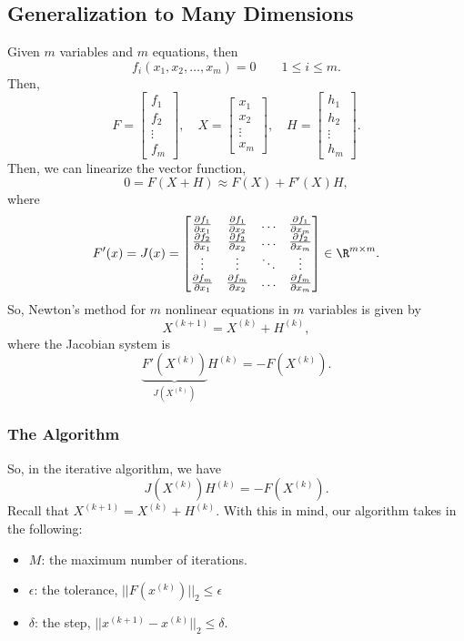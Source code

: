 \documentclass[letterpaper]{article}
\begin{document}
\subsection{Generalization to Many Dimensions}
Given $m$ variables and $m$ equations, then 
\[f_{i}(x_1, x_2, \hdots, x_m) = 0 \qquad 1 \leq i \leq m.\]
Then, 
\[F = \begin{bmatrix}
    f_1 \\ f_2 \\ \vdots \\ f_m
\end{bmatrix}, \quad X = \begin{bmatrix}
    x_1 \\ x_2 \\ \vdots \\ x_m 
\end{bmatrix}, \quad H = \begin{bmatrix}
    h_1 \\ h_2 \\ \vdots \\ h_m
\end{bmatrix}.\]
Then, we can linearize the vector function, 
\[0 = F(X + H) \approx F(X) + F'(X)H,\]
where 
\[F'(x) = J(x) = \begin{bmatrix}
    \frac{\partial f_1}{\partial x_1} & \frac{\partial f_1}{\partial x_2} & \hdots & \frac{\partial f_1}{\partial x_m} \\ 
    \frac{\partial f_2}{\partial x_1} & \frac{\partial f_2}{\partial x_2} & \hdots & \frac{\partial f_2}{\partial x_m} \\ 
    \vdots & \vdots & \ddots & \vdots \\ 
    \frac{\partial f_m}{\partial x_1} & \frac{\partial f_m}{\partial x_2} & \hdots & \frac{\partial f_m}{\partial x_m}
\end{bmatrix} \in \R^{m \times m}.\]
So, Newton's method for $m$ nonlinear equations in $m$ variables is given by \[X^{(k + 1)} = X^{(k)} + H^{(k)},\]
where the Jacobian system is 
\[\underbrace{F'(X^{(k)})}_{J(X^{(k)})} H^{(k)} = -F(X^{(k)}).\]

\subsubsection{The Algorithm}
So, in the iterative algorithm, we have 
\[J(X^{(k)}) H^{(k)} = -F(X^{(k)}).\] 
Recall that $X^{(k + 1)} = X^{(k)} + H^{(k)}$. With this in mind, our algorithm takes in the following: 
\begin{itemize}
    \item $M$: the maximum number of iterations. 
    \item $\epsilon$: the tolerance, $||F(x^{(k)})||_2 \leq \epsilon$
    \item $\delta$: the step, $||x^{(k + 1)} - x^{(k)}||_2 \leq \delta$. 
\end{itemize}
\end{document}
